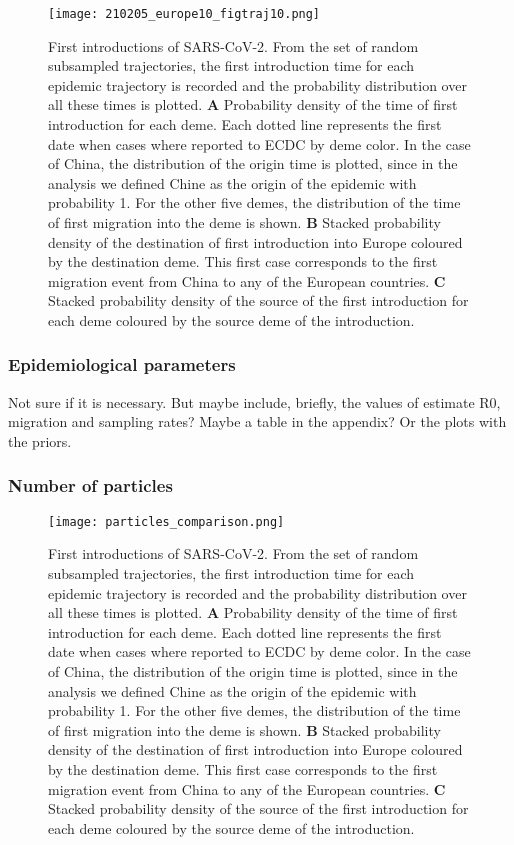 \begin{figure}[p]
    \centering
    \texttt{[image: 210205\_europe10\_figtraj10.png]}
    \caption{First introductions of SARS-CoV-2. From the set of random subsampled trajectories, the first introduction time for each epidemic trajectory is recorded and the probability distribution over all these times is plotted. \textbf{A} Probability density of the time of first introduction for each deme. Each dotted line represents the first date when cases where reported to ECDC by deme color. In the case of China, the distribution of the origin time is plotted, since in the analysis we defined Chine as the origin of the epidemic with probability 1. For the other five demes, the distribution of the time of first migration into the deme is shown. \textbf{B} Stacked probability density of the destination of first introduction into Europe coloured by the destination deme. This first case corresponds to the first migration event from China to any of the European countries. \textbf{C} Stacked probability density of the source of the first introduction for each deme coloured by the source deme of the introduction.}
    \label{fig:first}
\end{figure}


\subsubsection*{Epidemiological parameters}

Not sure if it is necessary. But maybe include, briefly, the values of estimate R0, migration and sampling rates?
Maybe a table in the appendix? Or the plots with the priors.

\subsubsection*{Number of particles}

\begin{figure}[p]
    \centering
    \texttt{[image: particles\_comparison.png]}
    \caption{First introductions of SARS-CoV-2. From the set of random subsampled trajectories, the first introduction time for each epidemic trajectory is recorded and the probability distribution over all these times is plotted. \textbf{A} Probability density of the time of first introduction for each deme. Each dotted line represents the first date when cases where reported to ECDC by deme color. In the case of China, the distribution of the origin time is plotted, since in the analysis we defined Chine as the origin of the epidemic with probability 1. For the other five demes, the distribution of the time of first migration into the deme is shown. \textbf{B} Stacked probability density of the destination of first introduction into Europe coloured by the destination deme. This first case corresponds to the first migration event from China to any of the European countries. \textbf{C} Stacked probability density of the source of the first introduction for each deme coloured by the source deme of the introduction.}
    \label{fig:particles}
\end{figure}